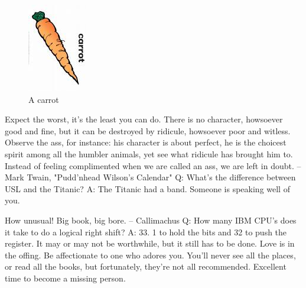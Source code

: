 \begin{figure}[Htb]
\begin{center}
\includegraphics{carrot}
\end{center}
\caption{A carrot}
\end{figure}

Expect the worst, it's the least you can do.
There is no character, howsoever good and fine, but it can be destroyed by
ridicule, howsoever poor and witless.  Observe the ass, for instance: his
character is about perfect, he is the choicest spirit among all the humbler
animals, yet see what ridicule has brought him to.  Instead of feeling
complimented when we are called an ass, we are left in doubt.
		-- Mark Twain, "Pudd'nhead Wilson's Calendar"
Q:	What's the difference between USL and the Titanic?
A:	The Titanic had a band.
Someone is speaking well of you.

How unusual!
Big book, big bore.
		-- Callimachus
Q:	How many IBM CPU's does it take to do a logical right shift?
A:	33.  1 to hold the bits and 32 to push the register.
It may or may not be worthwhile, but it still has to be done.
Love is in the offing.  Be affectionate to one who adores you.
You'll never see all the places, or read all the books, but fortunately,
they're not all recommended.
Excellent time to become a missing person.

